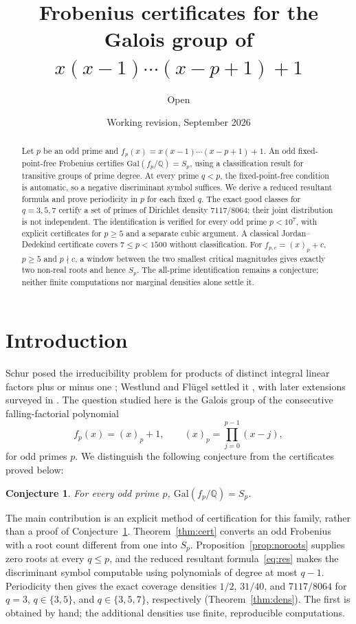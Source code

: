 \documentclass[11pt,a4paper]{amsart}
\title[Frobenius certificates for falling factorials]{Frobenius certificates for the Galois group of \(x(x-1)\cdots(x-p+1)+1\)}
\author{Open}
\date{Working revision, September 2026}
\newcommand{\Q}{\mathbb{Q}}
\newcommand{\Gal}{\mathrm{Gal}}
\theoremstyle{plain}
\newtheorem{conjecture}[theorem]{Conjecture}
\theoremstyle{definition}
\begin{document}
\raggedbottom
\begin{abstract}
Let \(p\) be an odd prime and \(f_p(x)=x(x-1)\cdots(x-p+1)+1\).
An odd fixed-point-free Frobenius certifies \(\Gal(f_p/\Q)=S_p\), using a classification result for transitive groups of prime degree. At every prime \(q<p\), the fixed-point-free condition is automatic, so a negative discriminant symbol suffices. We derive a reduced resultant formula and prove periodicity in \(p\) for each fixed \(q\). The exact good classes for \(q=3,5,7\) certify a set of primes of Dirichlet density \(7117/8064\); their joint distribution is not independent. The identification is verified for every odd prime \(p<10^7\), with explicit certificates for \(p\ge5\) and a separate cubic argument. A classical Jordan--Dedekind certificate covers \(7\le p<1500\) without classification. For \(f_{p,c}=(x)_p+c\), \(p\ge5\) and \(p\nmid c\), a window between the two smallest critical magnitudes gives exactly two non-real roots and hence \(S_p\). The all-prime identification remains a conjecture; neither finite computations nor marginal densities alone settle it.
\end{abstract}

\maketitle

\section{Introduction}
\label{sec:intro}

Schur posed the irreducibility problem for products of distinct integral linear factors plus or minus one \cite{Schur1908}; Westlund and Fl\"ugel settled it \cite{Westlund}, with later extensions surveyed in \cite{GyoryHajduTijdeman}. The question studied here is the Galois group of the consecutive falling-factorial polynomial
\[
 f_p(x)=(x)_p+1,\qquad (x)_p=\prod_{j=0}^{p-1}(x-j),
\]
for odd primes \(p\). We distinguish the following conjecture from the certificates proved below:
\begin{conjecture}
\label{conj:all}
For every odd prime \(p\), \(\Gal(f_p/\Q)=S_p\).
\end{conjecture}

The main contribution is an explicit method of certification for this family, rather than a proof of Conjecture~\ref{conj:all}. Theorem~\ref{thm:cert} converts an odd Frobenius with a root count different from one into \(S_p\). Proposition~\ref{prop:noroots} supplies zero roots at every \(q\le p\), and the reduced resultant formula~\eqref{eq:res} makes the discriminant symbol computable using polynomials of degree at most \(q-1\). Periodicity then gives the exact coverage densities \(1/2\), \(31/40\), and \(7117/8064\) for \(q=3\), \(q\in\{3,5\}\), and \(q\in\{3,5,7\}\), respectively (Theorem~\ref{thm:dens}). The first is obtained by hand; the additional densities use finite, reproducible computations.
\end{document}
